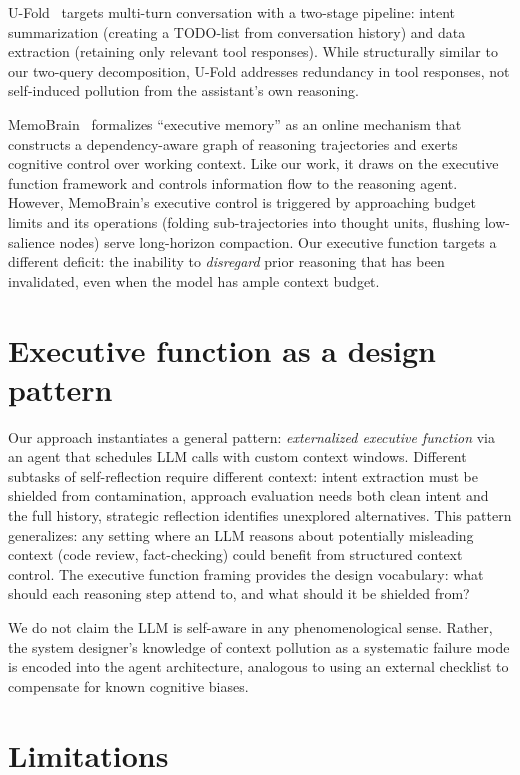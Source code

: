\documentclass{article}
\begin{document}
U-Fold~\citep{su2026ufold} targets multi-turn conversation with a two-stage pipeline: intent summarization (creating a TODO-list from conversation history) and data extraction (retaining only relevant tool responses). While structurally similar to our two-query decomposition, U-Fold addresses redundancy in tool responses, not self-induced pollution from the assistant's own reasoning.

MemoBrain~\citep{qian2026memobrain} formalizes ``executive memory'' as an online mechanism that constructs a dependency-aware graph of reasoning trajectories and exerts cognitive control over working context. Like our work, it draws on the executive function framework and controls information flow to the reasoning agent. However, MemoBrain's executive control is triggered by approaching budget limits and its operations (folding sub-trajectories into thought units, flushing low-salience nodes) serve long-horizon compaction. Our executive function targets a different deficit: the inability to \emph{disregard} prior reasoning that has been invalidated, even when the model has ample context budget.

\section{Executive function as a design pattern}
\label{app:exec-function-pattern}

Our approach instantiates a general pattern: \emph{externalized executive function} via an agent that schedules LLM calls with custom context windows. Different subtasks of self-reflection require different context: intent extraction must be shielded from contamination, approach evaluation needs both clean intent and the full history, strategic reflection identifies unexplored alternatives. This pattern generalizes: any setting where an LLM reasons about potentially misleading context (code review, fact-checking) could benefit from structured context control. The executive function framing provides the design vocabulary: what should each reasoning step attend to, and what should it be shielded from?

We do not claim the LLM is self-aware in any phenomenological sense. Rather, the system designer's knowledge of context pollution as a systematic failure mode is encoded into the agent architecture, analogous to using an external checklist to compensate for known cognitive biases.

\section{Limitations}
\label{app:limitations}
\end{document}
